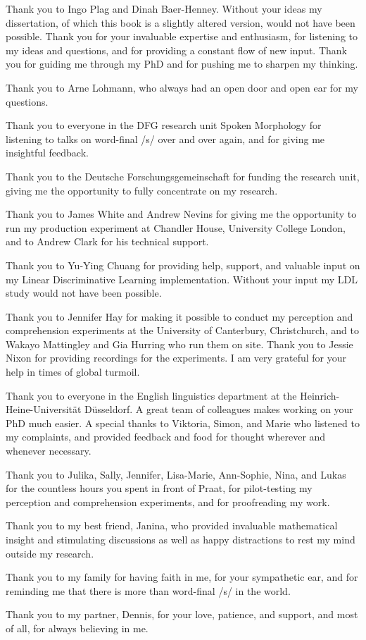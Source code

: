\addchap{\lsAcknowledgementTitle} 

Thank you to Ingo Plag and Dinah Baer-Henney. Without your ideas my dissertation, of which this book is a slightly altered version, would not have been possible. Thank you for your invaluable expertise and enthusiasm, for listening to my ideas and questions, and for providing a constant flow of new input. Thank you for guiding me through my PhD and for pushing me to sharpen my thinking.

Thank you to Arne Lohmann, who always had an open door and open ear for my questions.

Thank you to everyone in the DFG research unit Spoken Morphology for listening to talks on word-final /s/ over and over again, and for giving me insightful feedback. 

Thank you to the Deutsche Forschungsgemeinschaft for funding the research unit, giving me the opportunity to fully concentrate on my research.

Thank you to James White and Andrew Nevins for giving me the opportunity to run my production experiment at Chandler House, University College London, and to Andrew Clark for his technical support.

Thank you to Yu-Ying Chuang for providing help, support, and valuable input on my Linear Discriminative Learning implementation. Without your input my LDL study would not have been possible.

Thank you to Jennifer Hay for making it possible to conduct my perception and comprehension experiments at the University of Canterbury, Christchurch, and to Wakayo Mattingley and Gia Hurring who run them on site. Thank you to Jessie Nixon for providing recordings for the experiments. I am very grateful for your help in times of global turmoil.

Thank you to everyone in the English linguistics department at the Heinrich-Heine-Universität Düsseldorf. A great team of colleagues makes working on your PhD much easier. A special thanks to Viktoria, Simon, and Marie who listened to my complaints, and provided feedback and food for thought wherever and whenever necessary.

Thank you to Julika, Sally, Jennifer, Lisa-Marie, Ann-Sophie, Nina, and Lukas for the countless hours you spent in front of Praat, for pilot-testing my perception and comprehension experiments, and for proofreading my work.

Thank you to my best friend, Janina, who provided invaluable mathematical insight and stimulating discussions as well as happy distractions to rest my mind outside my research.

Thank you to my family for having faith in me, for your sympathetic ear, and for reminding me that there is more than word-final /s/ in the world.

Thank you to my partner, Dennis, for your love, patience, and support, and most of all, for always believing in me.


